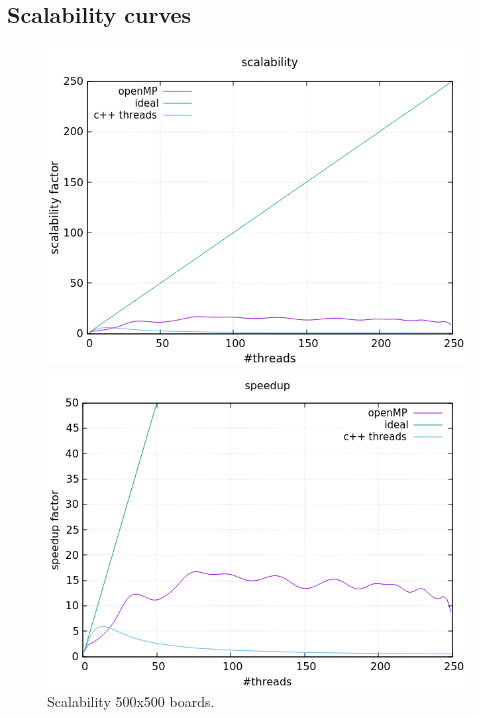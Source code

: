 \documentclass[a4paper,10pt]{article}
\begin{document}
\subsection{Scalability curves}
\begin{figure}[H]
	\centering
	\begin{minipage}[t]{0.55\linewidth}
		\includegraphics[width=\linewidth]{500_standard_scal.png}
	\end{minipage}%
	\begin{minipage}[t]{0.55\linewidth}
		\includegraphics[width=\linewidth]{500_zoomed_scal.png}
	\end{minipage}
	\caption{Scalability 500x500 boards.}
	\label{500Scal}
\end{figure}
\end{document}
